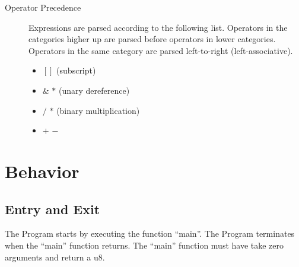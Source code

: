 \documentclass{article}
\begin{document}
\begin{description}
\begin{description}
		\end{description}
	\item[Operator Precedence]
		Expressions are parsed according to the following list. Operators in the categories higher up are parsed before operators in lower categories.
		Operators in the same category are parsed left-to-right (left-associative).
		\begin{itemize}
		\item $[]$ (subscript)
		\item \& $*$ (unary dereference)
		\item $/$ $*$ (binary multiplication)
		\item $+$ $-$
		\end{itemize}
	\end{description}

\section{Behavior}
	\subsection{Entry and Exit} The Program starts by executing the function ``main''. The Program terminates when the ``main'' function returns.
		The ``main'' function must have take zero arguments and return a u8.
\end{document}

